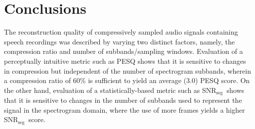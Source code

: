 \documentclass[10pt,a4paper,twoside]{article}
\newcommand{\snrseg}{SNR$_{\mathrm{seg}}$}
\begin{document}
\section{Conclusions}
The reconstruction quality of compressively sampled audio signals containing speech recordings was described by varying two distinct factors, namely, the compression ratio and number of subbands/sampling windows. Evaluation of a perceptually intuitive metric such as PESQ shows that it is sensitive to changes in compression but independent of the number of spectrogram subbands, wherein a compression ratio of 60\% is sufficient to yield an average (3.0) PESQ score. On the other hand, evaluation of a statistically-based metric such as \snrseg~shows that it is sensitive to changes in the number of subbands used to represent the signal in the spectrogram domain, where the use of more frames yields a higher \snrseg~score.




\end{document}
